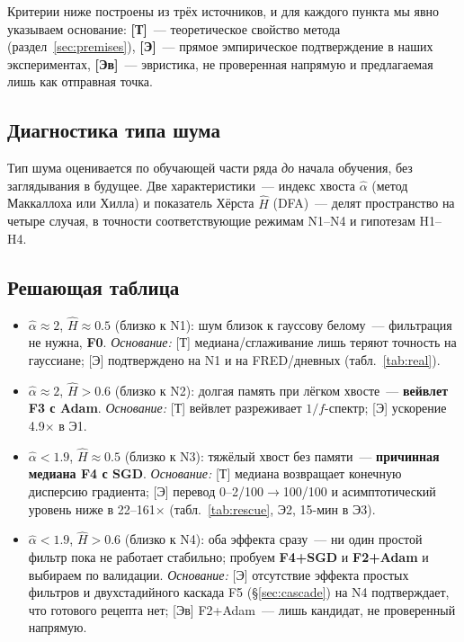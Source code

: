 \documentclass[conference]{IEEEtran}
\begin{document}
Критерии ниже построены из трёх источников, и для каждого пункта мы
явно указываем основание: \textbf{[Т]}~--- теоретическое свойство метода
(раздел~\ref{sec:premises}), \textbf{[Э]}~--- прямое эмпирическое
подтверждение в наших экспериментах, \textbf{[Эв]}~--- эвристика, не
проверенная напрямую и предлагаемая лишь как отправная точка.

\subsection{Диагностика типа шума}

Тип шума оценивается по обучающей части ряда \emph{до} начала обучения,
без заглядывания в будущее. Две характеристики~--- индекс хвоста
$\hat{\alpha}$ (метод Маккаллоха или Хилла) и показатель Хёрста $\hat{H}$
(DFA)~--- делят пространство на четыре случая, в точности соответствующие
режимам N1--N4 и гипотезам H1--H4.

\subsection{Решающая таблица}

\begin{itemize}
  \item $\hat{\alpha}\approx2$, $\hat{H}\approx0.5$ (близко к N1): шум
        близок к гауссову белому~--- фильтрация не нужна, \textbf{F0}.
        \emph{Основание:} [Т] медиана/сглаживание лишь теряют точность на
        гауссиане; [Э] подтверждено на N1 и на FRED/дневных
        (табл.~\ref{tab:real}).
  \item $\hat{\alpha}\approx2$, $\hat{H}>0.6$ (близко к N2): долгая память
        при лёгком хвосте~--- \textbf{вейвлет F3 с Adam}.
        \emph{Основание:} [Т] вейвлет разреживает $1/f$-спектр; [Э]
        ускорение 4.9$\times$ в Э1.
  \item $\hat{\alpha}<1.9$, $\hat{H}\approx0.5$ (близко к N3): тяжёлый
        хвост без памяти~--- \textbf{причинная медиана F4 с SGD}.
        \emph{Основание:} [Т] медиана возвращает конечную дисперсию
        градиента; [Э] перевод 0--2/100$\to$100/100 и асимптотический уровень ниже
        в 22--161$\times$ (табл.~\ref{tab:rescue}, Э2, 15-мин в Э3).
  \item $\hat{\alpha}<1.9$, $\hat{H}>0.6$ (близко к N4): оба эффекта
        сразу~--- ни один простой фильтр пока не работает стабильно;
        пробуем \textbf{F4+SGD} и \textbf{F2+Adam} и выбираем по
        валидации. \emph{Основание:} [Э] отсутствие эффекта простых
        фильтров и двухстадийного каскада F5 (§\ref{sec:cascade}) на N4
        подтверждает, что готового рецепта нет; [Эв]
        F2+Adam~--- лишь кандидат, не проверенный напрямую.
\end{itemize}
\end{document}

